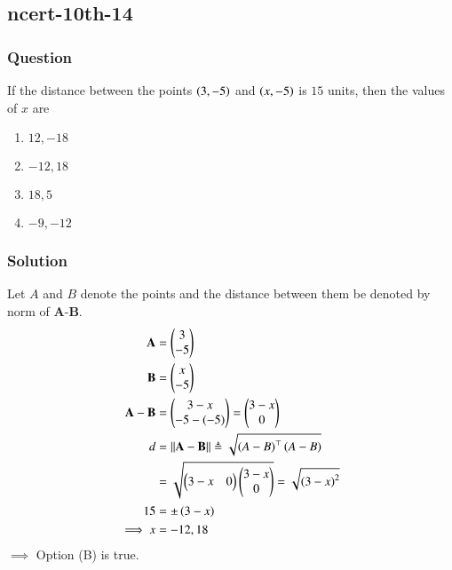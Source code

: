\documentclass[journal,12pt,onecolumn]{IEEEtran}
\theoremstyle{remark}
\begin{document}
\subsection{ncert-10th-14}
\subsubsection{Question}
If the distance between the points $\left(3,-5\right)$ and $\left(x,-5\right)$ is $15$ units, then the values of $x$ are
\begin{enumerate}
\item $12,-18$
\item $-12,18$
\item $18,5$
\item $-9,-12$
\end{enumerate}
\subsubsection{Solution}
Let $A$ and $B$ denote the points and the distance between them be denoted by norm of $\textbf{A}$-$\textbf{B}$.
\begin{align}
\textbf{A} &=
    \begin{pmatrix}
3 \\
-5 
\end{pmatrix}\\
\textbf{B} &=
    \begin{pmatrix}
x \\
-5 
\end{pmatrix}\\
\textbf{A}-\textbf{B} &= \begin{pmatrix}
        3-x\\
        -5 -\left(-5\right)
    \end{pmatrix} = \begin{pmatrix}
        3-x\\
        0
    \end{pmatrix}\\
d &= \lvert\lvert \textbf{A}-\textbf{B} \rvert\rvert \triangleq \sqrt{\left(A-B\right)^\top\left(A-B\right)}\\
&= \sqrt{\begin{pmatrix}
        3-x & 0
    \end{pmatrix}
\begin{pmatrix}
        3-x\\
        0
    \end{pmatrix}}
     = \sqrt{\left(3-x\right)^2}\\
  15 &= \pm\left(3-x\right)\\
 \implies  x &= -12,18
\end{align}
$\implies$ Option (B) is true.
\end{document}
